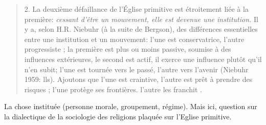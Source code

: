 \begin{quote}
2. La deuxième défaillance de l'Église primitive est étroitement liée
à la première: \textit{cessant d'être un mouvement, elle est devenue une
institution. }Il y a, selon H.R. Niebuhr (à la suite de Bergson), des
différences essentielles entre une institution et un mouvement: l'une
est conservatrice, l'autre progressiste ; la première est plus ou moins
passive, soumise à des influences extérieures, le second est actif, il
exerce une influence plutôt qu'il n'en subit; l'une est tournée vers le
passé, l'autre vers l'avenir (Niebuhr 1959: lls). Ajoutons que l'une
est craintive, l'autre est prêt à prendre des risques ; l'une protège ses
frontières. l'autre les franchit .
\end{quote}
\begin{Def}[Institution]
La chose instituée (personne morale, groupement, régime).
Mais ici, question sur la dialectique de la sociologie des religions plaquée sur l'Eglise primitive.
\end{Def}

